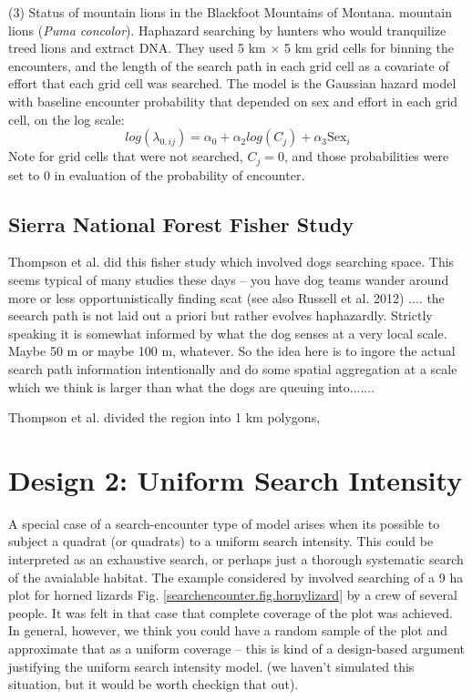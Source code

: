(3) Status of mountain lions in the Blackfoot Mountains of  Montana.
\citet{russell_etal:2012} mountain lions ({\it Puma
  concolor}). Haphazard searching by hunters who would tranquilize
treed lions and extract DNA.
They used 5 km $\times$ 5 km grid cells for binning the encounters,
and the length of the search path in each grid cell as a covariate of
effort that each grid cell was searched.
The model is the Gaussian hazard model with baseline encounter
probability that depended on sex and effort in each grid cell, on the
log scale:
\[
 log(\lambda_{0,ij}) =
\alpha_{0} + \alpha_{2} log(C_{j}) + \alpha_{3} \mbox{Sex}_{i}
\]
Note for grid cells that were not searched, $C_{j} =0$, and those
probabilities were set to 0 in evaluation of the probability of
encounter.







\subsection{Sierra National Forest Fisher Study}

Thompson et al. did this fisher study which involved dogs searching
space. This seems typical of many
studies these days -- you have dog teams wander around more or less
opportunistically finding scat
(see also Russell et al. 2012) .... the seearch path is not laid out a
priori but rather evolves haphazardly.  Strictly speaking it is
somewhat informed by what the dog senses at a very local scale. Maybe
50 m or maybe 100 m, whatever.
So the idea here is to ingore the actual search path information
intentionally and do some spatial aggregation at a scale which we
think is larger than what the dogs are queuing into.......

Thompson et al. divided the region into 1 km polygons,






\section{Design 2: Uniform Search Intensity}

A special case of a search-encounter type of model arises when its
possible to subject a quadrat (or quadrats) to a uniform search
intensity. This could be interpreted as an exhaustive search, or
perhaps just a thorough systematic search of the avaialable habitat.
The example considered by \citet{royle_young:2008} involved searching
of a 9 ha plot for horned lizards Fig.
\ref{searchencounter.fig.hornylizard} by a crew of
several people. It was felt in that case that complete coverage of
the plot was achieved. In general, however, we think you could have
a random sample of the plot and approximate that as a uniform coverage
-- this is kind of a design-based argument justifying the uniform
search intensity model. (we haven't simulated this situation, but it
would be worth checkign that out).

